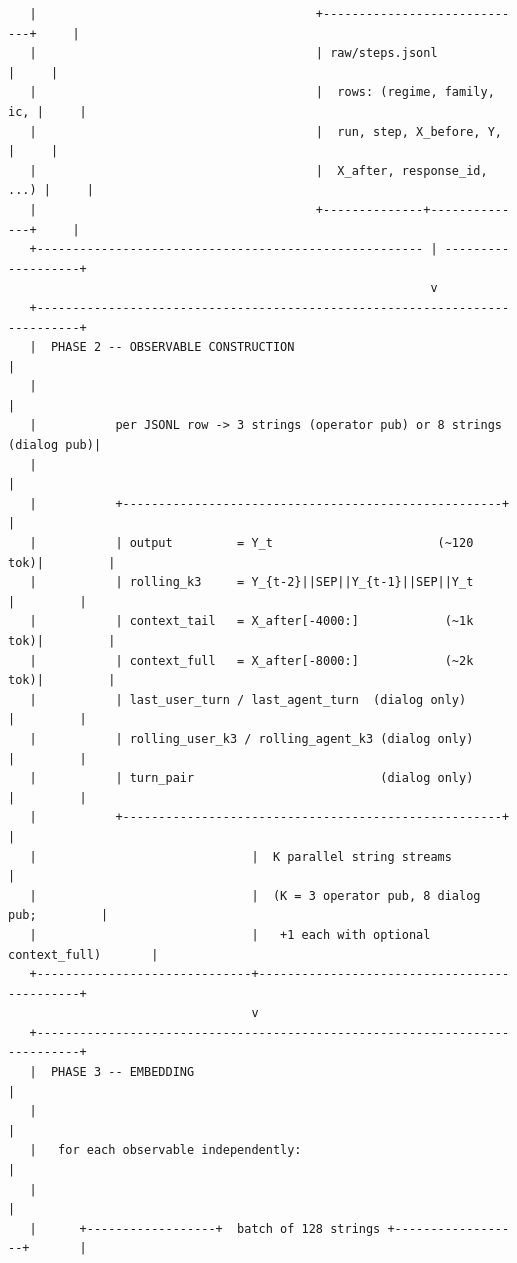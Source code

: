 \documentclass{article}
\theoremstyle{plain}
\theoremstyle{definition}
\begin{document}
\begin{verbatim}
   |                                       +-----------------------------+     |
   |                                       | raw/steps.jsonl             |     |
   |                                       |  rows: (regime, family, ic, |     |
   |                                       |  run, step, X_before, Y,    |     |
   |                                       |  X_after, response_id, ...) |     |
   |                                       +--------------+--------------+     |
   +------------------------------------------------------ | -------------------+
                                                           v
   +----------------------------------------------------------------------------+
   |  PHASE 2 -- OBSERVABLE CONSTRUCTION                                         |
   |                                                                            |
   |           per JSONL row -> 3 strings (operator pub) or 8 strings (dialog pub)|
   |                                                                            |
   |           +-----------------------------------------------------+          |
   |           | output         = Y_t                       (~120 tok)|         |
   |           | rolling_k3     = Y_{t-2}||SEP||Y_{t-1}||SEP||Y_t     |         |
   |           | context_tail   = X_after[-4000:]            (~1k tok)|         |
   |           | context_full   = X_after[-8000:]            (~2k tok)|         |
   |           | last_user_turn / last_agent_turn  (dialog only)      |         |
   |           | rolling_user_k3 / rolling_agent_k3 (dialog only)     |         |
   |           | turn_pair                          (dialog only)     |         |
   |           +-----------------------------------------------------+          |
   |                              |  K parallel string streams                  |
   |                              |  (K = 3 operator pub, 8 dialog pub;         |
   |                              |   +1 each with optional context_full)       |
   +------------------------------+---------------------------------------------+
                                  v
   +----------------------------------------------------------------------------+
   |  PHASE 3 -- EMBEDDING                                                       |
   |                                                                            |
   |   for each observable independently:                                       |
   |                                                                            |
   |      +------------------+  batch of 128 strings +------------------+       |

\end{verbatim}
\end{document}
